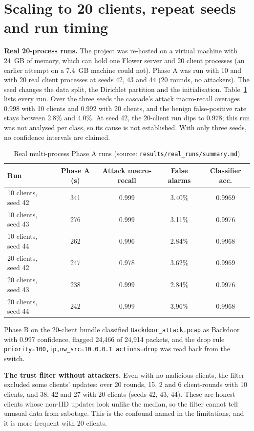 \section{Scaling to 20 clients, repeat seeds and run timing}
\textbf{Real 20-process runs.} The project was re-hosted on a virtual machine with 24~GB of memory, which can hold one Flower server and 20 client processes (an earlier attempt on a 7.4~GB machine could not). Phase A was run with 10 and with 20 real client processes at seeds 42, 43 and 44 (20 rounds, no attackers). The seed changes the data split, the Dirichlet partition and the initialisation. Table~\ref{tab:realruns} lists every run. Over the three seeds the cascade's attack macro-recall averages 0.998 with 10 clients and 0.992 with 20 clients, and the benign false-positive rate stays between 2.8\% and 4.0\%. At seed 42, the 20-client run dips to 0.978; this run was not analysed per class, so its cause is not established. With only three seeds, no confidence intervals are claimed.

\begin{table}[H]
\centering
\renewcommand{\arraystretch}{1.2}
\begin{tabular}{|l|c|c|c|c|}
\hline
\textbf{Run} & \textbf{Phase A (s)} & \textbf{Attack macro-recall} & \textbf{False alarms} & \textbf{Classifier acc.} \\ \hline
10 clients, seed 42 & 341 & 0.999 & 3.40\% & 0.9969 \\ \hline
10 clients, seed 43 & 276 & 0.999 & 3.11\% & 0.9976 \\ \hline
10 clients, seed 44 & 262 & 0.996 & 2.84\% & 0.9968 \\ \hline
20 clients, seed 42 & 247 & 0.978 & 3.62\% & 0.9969 \\ \hline
20 clients, seed 43 & 238 & 0.999 & 2.84\% & 0.9976 \\ \hline
20 clients, seed 44 & 242 & 0.999 & 3.96\% & 0.9968 \\ \hline
\end{tabular}
\caption{Real multi-process Phase A runs (source: \texttt{results/real\_runs/summary.md})}
\label{tab:realruns}
\end{table}

Phase B on the 20-client bundle classified \texttt{Backdoor\_attack.pcap} as Backdoor with 0.997 confidence, flagged 24{,}466 of 24{,}914 packets, and the drop rule \texttt{priority=100,ip,nw\_src=10.0.0.1 actions=drop} was read back from the switch.

\textbf{The trust filter without attackers.} Even with no malicious clients, the filter excluded some clients' updates: over 20 rounds, 15, 2 and 6 client-rounds with 10 clients, and 38, 42 and 27 with 20 clients (seeds 42, 43, 44). These are honest clients whose non-IID updates look unlike the median, so the filter cannot tell unusual data from sabotage. This is the confound named in the limitations, and it is more frequent with 20 clients.

